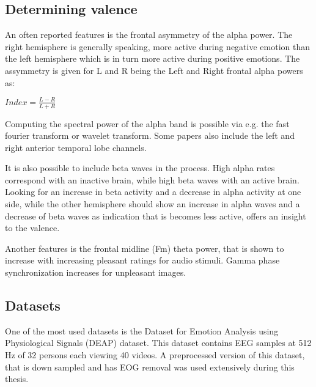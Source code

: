 \subsection{Determining valence}
An often reported features is the frontal asymmetry of the alpha power\cite{GivenPaper}.
The right hemisphere is generally speaking, more active during negative emotion than the left hemisphere which is in turn more active during positive emotions\cite{RealTimeEEGEmotion}\cite{EEGDatasets}. The assymmetry is given for L and R being the Left and Right frontal alpha powers as:\\
\begin{center}
$Index = \frac{L-R}{L+R}$
\end{center}
Computing the spectral power of the alpha band is possible via e.g. the fast fourier transform or wavelet transform. Some papers also include the left and right anterior temporal lobe channels.

\npar

It is also possible to include beta waves in the process. High alpha rates correspond with an inactive brain, while high beta waves with an active brain. Looking for an increase in beta activity and a decrease in alpha activity at one side, while the other hemisphere should show an increase in alpha waves and a decrease of beta waves as indication that is becomes less active, offers an insight to the valence\cite{ExtendedPaper}. 

\npar

Another features is the frontal midline (Fm) theta power, that is shown to increase with increasing pleasant ratings for audio stimuli\cite{MusicPaper}. Gamma phase synchronization increases for unpleasant images.

\subsection{Datasets}
One of the most used datasets is the Dataset for Emotion Analysis using Physiological Signals (DEAP) dataset\cite{DEAP}. This dataset contains EEG samples at 512 Hz of 32 persons each viewing 40 videos. A preprocessed version of this dataset, that is down sampled and has EOG removal was used extensively during this thesis.

\npar

